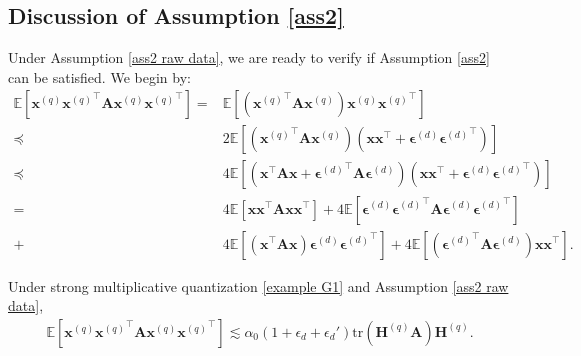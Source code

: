 \documentclass[11pt, letterpaper]{article}
\begin{document}
\subsection{Discussion of Assumption \ref{ass2}}
Under Assumption \ref{ass2 raw data}, we are ready to verify if Assumption \ref{ass2} can be satisfied. We begin by:
\begin{equation}
\label{G0}
    \begin{aligned}
        \mathbb{E}\left[{\mathbf{x}^{(q)}}{\mathbf{x}^{(q)}}^\top\mathbf{A}{\mathbf{x}^{(q)}}{\mathbf{x}^{(q)}}^\top\right]=&\mathbb{E}\left[\left({\mathbf{x}^{(q)}}^\top\mathbf{A}{\mathbf{x}^{(q)}}\right){\mathbf{x}^{(q)}}{\mathbf{x}^{(q)}}^\top\right]\\
        \preceq &2\mathbb{E}\left[\left({\mathbf{x}^{(q)}}^\top\mathbf{A}{\mathbf{x}^{(q)}}\right)({\mathbf{x}}{\mathbf{x}}^\top+\boldsymbol{\epsilon}^{(d)}{\boldsymbol{\epsilon}^{(d)}}^\top)\right]\\
        \preceq& 4\mathbb{E}\left[\left({\mathbf{x}}^\top\mathbf{A}{\mathbf{x}}+{\boldsymbol{\epsilon}^{(d)}}^\top \mathbf{A}\boldsymbol{\epsilon}^{(d)}\right)({\mathbf{x}}{\mathbf{x}}^\top+\boldsymbol{\epsilon}^{(d)}{\boldsymbol{\epsilon}^{(d)}}^\top)\right]\\
        =&4\mathbb{E}\left[\mathbf{x}{\mathbf{x}}^\top\mathbf{A}{\mathbf{x}}{\mathbf{x}}^\top\right]+4\mathbb{E}\left[\boldsymbol{\epsilon}^{(d)}{\boldsymbol{\epsilon}^{(d)}}^\top\mathbf{A}\boldsymbol{\epsilon}^{(d)}{\boldsymbol{\epsilon}^{(d)}}^\top\right]\\
        +&4\mathbb{E}\left[\left({\mathbf{x}}^\top\mathbf{A}{\mathbf{x}}\right)\boldsymbol{\epsilon}^{(d)}{\boldsymbol{\epsilon}^{(d)}}^\top\right]+4\mathbb{E}\left[\left({\boldsymbol{\epsilon}^{(d)}}^\top\mathbf{A}{\boldsymbol{\epsilon}^{(d)}}\right){\mathbf{x}}{\mathbf{x}}^\top\right].
    \end{aligned}
\end{equation}
\begin{lemma}
    Under strong multiplicative quantization \ref{example G1} and Assumption \ref{ass2 raw data}, 
    \begin{equation*}
        \begin{aligned}
            \mathbb{E}\left[{\mathbf{x}^{(q)}}{\mathbf{x}^{(q)}}^\top\mathbf{A}{\mathbf{x}^{(q)}}{\mathbf{x}^{(q)}}^\top\right]\lesssim\alpha_0{(1+\epsilon_d+\epsilon_d')}\mathrm{tr}(\mathbf{H}^{(q)}\mathbf{A})\mathbf{H}^{(q)}.
        \end{aligned}
    \end{equation*}
\end{lemma}
\end{document}
